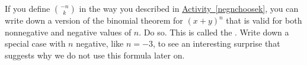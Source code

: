 \documentclass{book}
\begin{document}
\setcounter{cpjt}{254}
\addtocounter{cpjt}{-1}
\begin{activity}\label{activity-247}
\hypertarget{p-1320}{}%
If you define \(\binom{-n}{k}\) in the way you described in \hyperref[negnchoosek]{Activity~\ref{negnchoosek}}, you can write down a version of the binomial theorem for \((x+y)^n\) that is valid for both nonnegative and negative values of \(n\). Do so. This is called the . Write down a special case with \(n\) negative, like \(n=-3\), to see an interesting surprise that suggests why we do not use this formula later on.%
\par\smallskip%
\noindent\end{activity}

\clearpage
\end{document}
